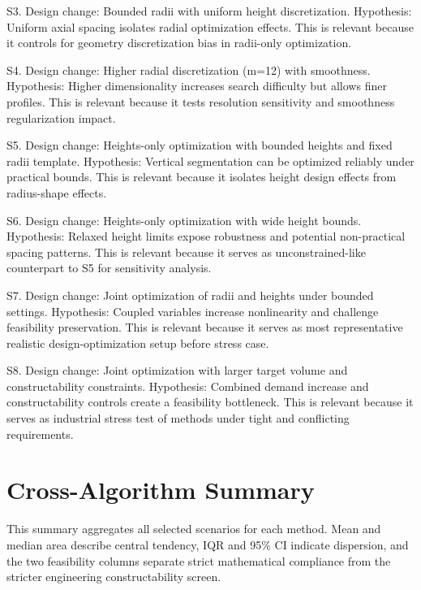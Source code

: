 S3. Design change: Bounded radii with uniform height discretization. Hypothesis: Uniform axial spacing isolates radial optimization effects. This is relevant because it controls for geometry discretization bias in radii-only optimization.


S4. Design change: Higher radial discretization (m=12) with smoothness. Hypothesis: Higher dimensionality increases search difficulty but allows finer profiles. This is relevant because it tests resolution sensitivity and smoothness regularization impact.


S5. Design change: Heights-only optimization with bounded heights and fixed radii template. Hypothesis: Vertical segmentation can be optimized reliably under practical bounds. This is relevant because it isolates height design effects from radius-shape effects.


S6. Design change: Heights-only optimization with wide height bounds. Hypothesis: Relaxed height limits expose robustness and potential non-practical spacing patterns. This is relevant because it serves as unconstrained-like counterpart to S5 for sensitivity analysis.


S7. Design change: Joint optimization of radii and heights under bounded settings. Hypothesis: Coupled variables increase nonlinearity and challenge feasibility preservation. This is relevant because it serves as most representative realistic design-optimization setup before stress case.


S8. Design change: Joint optimization with larger target volume and constructability constraints. Hypothesis: Combined demand increase and constructability controls create a feasibility bottleneck. This is relevant because it serves as industrial stress test of methods under tight and conflicting requirements.


\chapter{Cross-Algorithm Summary}

This summary aggregates all selected scenarios for each method. Mean and median area describe central tendency, IQR and 95\% CI indicate dispersion, and the two feasibility columns separate strict mathematical compliance from the stricter engineering constructability screen.


